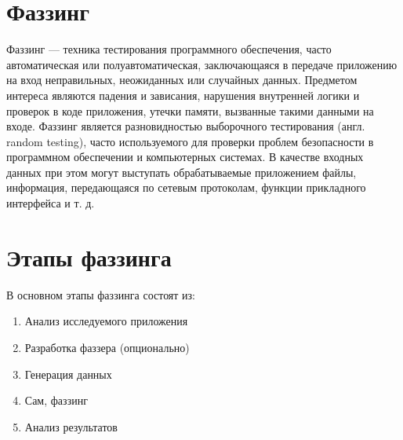 \documentclass[areasetadvanced]{scrartcl}
\begin{document}
\section{Фаззинг}
Фаззинг — техника тестирования программного обеспечения, часто автоматическая или
полуавтоматическая, заключающаяся в передаче приложению на вход неправильных,
неожиданных или случайных данных. Предметом интереса являются падения и зависания,
нарушения внутренней логики и проверок в коде приложения, утечки памяти, вызванные такими
данными на входе. Фаззинг является разновидностью выборочного тестирования (англ. random
testing), часто используемого для проверки проблем безопасности в программном обеспечении и
компьютерных системах. В качестве входных данных при этом могут выступать обрабатываемые
приложением файлы, информация, передающаяся по сетевым протоколам, функции прикладного
интерфейса и т. д.
\newpage
\section{Этапы фаззинга}
В основном этапы фаззинга состоят из:
\begin{enumerate}
    \item Анализ исследуемого приложения
    \item Разработка фаззера (опционально)
    \item Генерация данных
    \item Сам, фаззинг
    \item Анализ результатов
\end{enumerate}
\newpage
\end{document}
